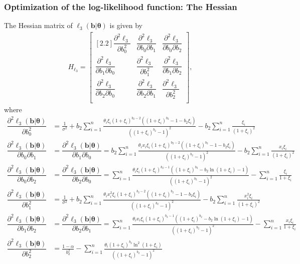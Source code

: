 \documentclass[11pt, letterpaper]{article}
\numberwithin{equation}{section}
\begin{document}
\subsubsection{Optimization of the log-likelihood function: The Hessian}
The Hessian matrix of $\ell_3(\bm b | \bm \theta)$ is given by
\begin{align*}
H_{\ell_3} = \begin{bmatrix}[2.2]
\dfrac{\partial^2 \ell_3}{\partial b_0 ^2} & \dfrac{\partial^2 \ell_3}{\partial b_0 \partial b_1} & \dfrac{\partial^2 \ell_3}{\partial b_0 \partial b_2} \\
\dfrac{\partial^2 \ell_3}{\partial b_1  \partial b_0} & \dfrac{\partial^2 \ell_3}{\partial b_1^2} & \dfrac{\partial^2 \ell_3}{\partial b_1 \partial b_2} \\
\dfrac{\partial^2 \ell_3}{\partial b_2  \partial b_0}  & \dfrac{\partial^2 \ell_3}{\partial b_2 \partial b_1} & \dfrac{\partial^2 \ell_3}{\partial b_2^2}\\
\end{bmatrix},
\end{align*}
where
\begin{align*}
\dfrac{\partial^2 \ell_3(\bm b | \bm \theta)}{\partial b_0 ^2} &=  \frac{1}{\sigma^2} + b_2 \sum_{i=1}^n \frac{\theta_i \xi_i (1+\xi_i)^{b_2-2}((1+\xi_i)^{b_2} - 1 - b_2 \xi_i)}{\left((1+\xi_i)^{b_2} - 1 \right)^2} -b_2 \sum_{i=1}^n \frac{ \xi_i}{(1+\xi_i )^2}\\
\dfrac{\partial^2 \ell_3(\bm b | \bm \theta)}{\partial b_0 \partial b_1} &= \dfrac{\partial^2 \ell_3(\bm b | \bm \theta)}{\partial b_1 \partial b_0} =  b_2 \sum_{i=1}^n \frac{\theta_ix_i \xi_i (1+\xi_i)^{b_2-2}((1+\xi_i)^{b_2} - 1 - b_2 \xi_i)}{\left((1+\xi_i)^{b_2} - 1 \right)^2} -b_2 \sum_{i=1}^n \frac{x_i \xi_i}{(1+\xi_i )^2}\\
\dfrac{\partial^2 \ell_3(\bm b | \bm \theta)}{\partial b_0 \partial b_2} &= \dfrac{\partial^2 \ell_3(\bm b | \bm \theta)}{\partial b_2 \partial b_0} = \sum_{i=1}^n \frac{\theta_i\xi_i(1+\xi_i)^{b_2-1}\left((1+\xi_i)^{b_2}- b_2 \ln (1+\xi_i) -1 \right)}{\left((1+\xi_i)^{b_2} - 1 \right)^2} - \sum_{i=1}^n \frac{\xi_i}{1+\xi_i}\\
\dfrac{\partial^2 \ell_3(\bm b | \bm \theta)}{\partial b_1 ^2} &= \frac{1}{\sigma^2} + b_2 \sum_{i=1}^n \frac{\theta_i x_i^2\xi_i (1+\xi_i)^{b_2-2}((1+\xi_i)^{b_2} - 1-b_2 \xi_i)}{\left((1+\xi_i)^{b_2} - 1 \right)^2} -b_2 \sum_{i=1}^n \frac{x_i^2 \xi_i}{(1+\xi_i )^2}\\
\dfrac{\partial^2 \ell_3(\bm b | \bm \theta)}{\partial b_1 \partial b_2} &= \dfrac{\partial^2 \ell_3(\bm b | \bm \theta)}{\partial b_2 \partial b_1} =  \sum_{i=1}^n \frac{\theta_i x_i\xi_i(1+\xi_i)^{b_2-1}\left((1+\xi_i)^{b_2}- b_2 \ln (1+\xi_i) -1 \right)}{\left((1+\xi_i)^{b_2} - 1 \right)^2} - \sum_{i=1}^n \frac{x_i\xi_i}{1+\xi_i}\\
\dfrac{\partial^2 \ell_3(\bm b | \bm \theta)}{\partial b_2 ^2} &= \frac{1-\alpha}{b_2^2} - \sum_{i=1}^n \frac{\theta_i(1+\xi_i)^{b_2}\ln ^2(1+\xi_i)}{\left((1+\xi_i)^{b_2} - 1 \right)^2} \\
\end{align*}
\end{document}

